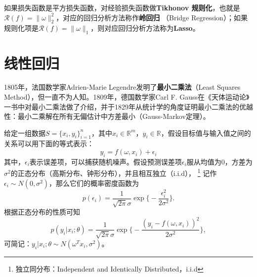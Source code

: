 如果损失函数是平方损失函数，对经验损失函数做\textbf{Tikhonov 规则化}，也就是$\mathcal{R}(f)=\|\omega\|_2^2$，对应的回归分析方法称作\textbf{岭回归}
（Bridge Regression）；如果规则化项是$\mathcal{R}(f)=\|\omega\|_1$，则对应回归分析方法称为\textbf{Lasso}\cite{tibshirani1996regression}。

\section{线性回归}
1805年，法国数学家Adrien-Marie Legendre发明了\textbf{最小二乘法}（Least Squares Method），但一直不为人知。1809年，德国数学家Carl F. Gauss在《天体运动论》一书中对最小二乘法做了介绍，并于1829年从统计学的角度证明最小二乘法的优越性：最小二乘解在所有无偏估计中方差最小（Gauss-Markov定理）。

给定一组数据$\textit{S}=\{x_i,y_i\}_{i=1}^n$，其中$x_i\in \mathbb{R}^m$，$y_i\in \mathbb{R}$，假设目标值与输入值之间的关系可以用下面的等式表示：
\begin{equation}
    y_i = f(\omega,x_i) + \epsilon_i
\end{equation}
其中，$\epsilon_i$表示误差项，可以捕获随机噪声。假设预测误差项$\epsilon_i$服从均值为0，方差为$\sigma^2$的正态分布（高斯分布、钟形分布），并且相互独立（i.i.d），
\footnote{独立同分布：Independent and Identically Distributed，i.i.d}
记作$\epsilon_i\sim N(0,\sigma^2)$，那么它们的概率密度函数为
\begin{equation}
    p(\epsilon_i) = \frac{1}{\sqrt{2\pi}\sigma} \exp\big\{-\frac{\epsilon_i^2}{2\sigma^2}\big\}.
\end{equation}
根据正态分布的性质可知
\begin{equation}
    p(y_i|x_i;\theta) = \frac{1}{\sqrt{2\pi}\sigma} \exp\big\{-\frac{(y_i - f(\omega,x_i))^2}{2\sigma^2}\big\},
\end{equation}
可简记：$y_i|x_i;\theta\sim N(\omega^T x_i,\sigma^2)$。

